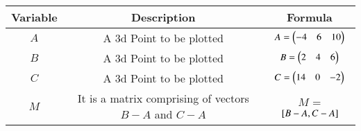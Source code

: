 \begin{center}
    \begin{tabular}{|c|c|c|} 
        \hline
            \textbf{Variable} & \textbf{Description} & \textbf{Formula} \\ 
        \hline
            $A$   & A 3d Point to be plotted & $A = \begin{pmatrix}-4 & 6 & 10\end{pmatrix}$ \\ 
        \hline
            $B$   &  A 3d Point to be plotted &  $B = \begin{pmatrix}2 & 4 & 6\end{pmatrix}$\\ 
        \hline
            $C$   & A 3d Point to be plotted & $C  = \begin{pmatrix}14& 0& -2\end{pmatrix}$\\ 
        \hline
            $M$   & It is a matrix comprising of vectors $B-A$ and $C-A$ & $M$ = \textbf{${}\left[B-A,C-A\right]$}\\ 
        \hline
    \end{tabular}
\end{center}  



